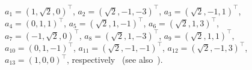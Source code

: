 \begin{figure}
{$a_{1}     = \left(    1,\sqrt{2},0     \right)^\intercal $,
$a_{2}     = \left(\sqrt{2}, -1, -3 \right)^\intercal $,
$a_{3}     = \left(   \sqrt{2},-1,1     \right)^\intercal $,
$a_{4}     = \left(    0,1,1     \right)^\intercal $,
$a_{5}     = \left(   \sqrt{2},1,-1     \right)^\intercal $,
$a_{6}     = \left(\sqrt{2}, 1, 3 \right)^\intercal $,
$a_{7}     = \left(    -1,\sqrt{2},0     \right)^\intercal $,
$a_{8}     = \left(\sqrt{2}, 1, -3 \right)^\intercal $,
$a_{9}     = \left(   \sqrt{2},1,1     \right)^\intercal $,
$a_{10}     = \left(    0,1,-1     \right)^\intercal $,
$a_{11}     = \left(   \sqrt{2},-1,-1     \right)^\intercal $,
$a_{12}     = \left(\sqrt{2}, -1, 3 \right)^\intercal $,
$a_{13}     = \left(    1,0,0     \right)^\intercal $,
respectively~\cite[p.~206, Fig.~1]{tkadlec-96}
(see also~\cite[Fig.~4, p.~5387]{svozil-tkadlec}).
%
%
%
}
\end{figure}
